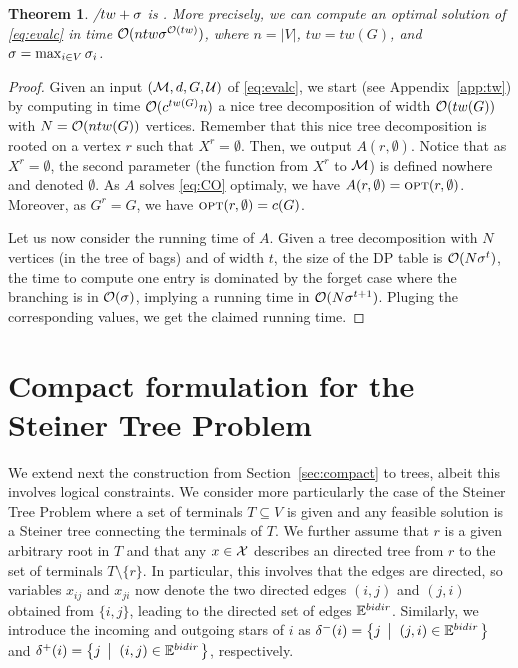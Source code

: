 \documentclass[12pt]{article}
\newtheorem{theorem}{Theorem}
\newcommand{\blue}[1]{{\color{black}#1}}
\begin{document}
\begin{appendix}
\begin{theorem}%
  \EVALC/$tw+\sigma$ is \FPT. More precisely, we can compute an optimal solution of \ref{eq:evalc} in time $\mathcal{O}(n tw \sigma^{\mathcal{O}(tw)})$, where $n = |V|$, $tw = tw(G)$,
  and $\sigma= \max_{i \in V}{\sigma_{i}}$.
\end{theorem}
\begin{proof} 
  Given an input $(\mathcal{M},d,G,\mathcal{U})$ of \ref{eq:evalc}, we start (see Appendix~\ref{app:tw}) by computing in time $\mathcal{O}(c^{tw(G)}n)$ a nice tree decomposition of width $\mathcal{O}(tw(G))$
  with $N = \mathcal{O}(n tw(G))$ vertices.
  Remember that this nice tree decomposition is rooted on a vertex $r$ such that $X^r=\emptyset$.
  Then, we output $A(r,\emptyset)$. Notice that as $X^r = \emptyset$, the second parameter (the function from $X^r$ to $\mathcal{M}$) is defined nowhere and denoted $\emptyset$.
   As $A$ solves \ref{eq:CO} optimaly, we have $A(r,\emptyset)=\mbox{\textsc{opt}}(r,\emptyset)$. Moreover, as $G^r = G$, we have $\mbox{\textsc{opt}}(r,\emptyset)=c(G)$.

   Let us now consider the running time of $A$. Given a tree decomposition with $N$ vertices (in the tree of bags) and of width $t$,
   the size of the DP table is $\mathcal{O}(N \sigma^t)$,  the time to compute one entry is dominated by the forget case where the branching is in $\mathcal{O}(\sigma)$,
   implying a running time in $\mathcal{O}(N \sigma^{t+1})$. Pluging the corresponding values, we get the claimed running time.
\end{proof}

\section{Compact formulation for the Steiner Tree Problem}
\label{app:compactSTP}

We extend next the construction from Section~\ref{sec:compact} to trees, albeit this involves logical constraints. We consider more particularly the case of the Steiner Tree Problem where a set of terminals $T\subseteq V$ is given and any feasible solution is a Steiner tree connecting the terminals of $T$. We further assume that $r$ is a given arbitrary root in $T$ and that any $x\in\mathcal{X}$ describes an directed tree from $r$ to the set of terminals $T\setminus \{r\}$. In particular, this involves that the edges are directed, so variables $x_{ij}$ and $x_{ji}$ now denote the two directed edges $(i,j)$ and $(j,i)$ obtained from $\{i,j\}$, leading to the directed set of edges $\mathbb{E}^{bidir}$. Similarly, we introduce the incoming and outgoing stars of $i$ as $\delta^-(i)=\left\{j \; \left|\;\; (j,i)\in \mathbb{E}^{bidir} \right.\right\}$ and $\delta^+(i)=\left\{j \; \left|\;\; (i,j)\in \mathbb{E}^{bidir} \right.\right\}$, \blue{respectively}.


\end{appendix}
\end{document}
